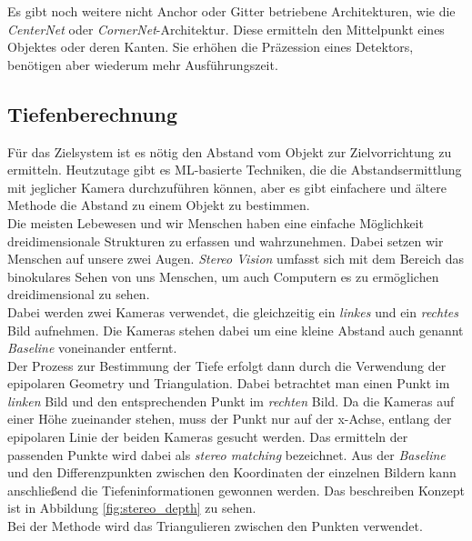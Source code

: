 Es gibt noch weitere nicht Anchor oder Gitter betriebene Architekturen, wie die \textit{CenterNet} oder \textit{CornerNet}-Architektur. Diese ermitteln den Mittelpunkt eines Objektes oder deren Kanten. Sie erhöhen die Präzession eines Detektors, benötigen aber wiederum mehr Ausführungszeit.\cite{yolo_all}

\subsection{Tiefenberechnung} \label{cap:stereo}

Für das Zielsystem ist es nötig den Abstand vom Objekt zur Zielvorrichtung zu ermitteln. Heutzutage gibt es \ac{ML}-basierte Techniken, die die Abstandsermittlung mit jeglicher Kamera durchzuführen können, aber es gibt einfachere und ältere Methode die Abstand zu einem Objekt zu bestimmen.
\\
Die meisten Lebewesen und wir Menschen haben eine einfache Möglichkeit dreidimensionale Strukturen zu erfassen und wahrzunehmen. Dabei setzen wir Menschen auf unsere zwei Augen. \textit{Stereo Vision} umfasst sich mit dem Bereich das binokulares Sehen von uns Menschen, um auch Computern es zu ermöglichen dreidimensional zu sehen.
\\
Dabei werden zwei Kameras verwendet, die gleichzeitig ein \textit{linkes} und ein \textit{rechtes} Bild aufnehmen. Die Kameras stehen dabei um eine kleine Abstand auch genannt \textit{Baseline} voneinander entfernt.
\\
Der Prozess zur Bestimmung der Tiefe erfolgt dann durch die Verwendung der epipolaren Geometry und Triangulation. Dabei betrachtet man einen Punkt im \textit{linken} Bild und den entsprechenden Punkt im \textit{rechten} Bild. Da die Kameras auf einer Höhe zueinander stehen, muss der Punkt nur auf der x-Achse, entlang der epipolaren Linie der beiden Kameras gesucht werden. Das ermitteln der passenden Punkte wird dabei als \textit{stereo matching} bezeichnet.
Aus der \textit{Baseline} und den Differenzpunkten zwischen den Koordinaten der einzelnen Bildern kann anschließend die Tiefeninformationen gewonnen werden. Das beschreiben Konzept ist in Abbildung \ref{fig:stereo_depth} zu sehen.
\\
Bei der Methode wird das Triangulieren zwischen den Punkten verwendet.
\cite{stereo_vision}


